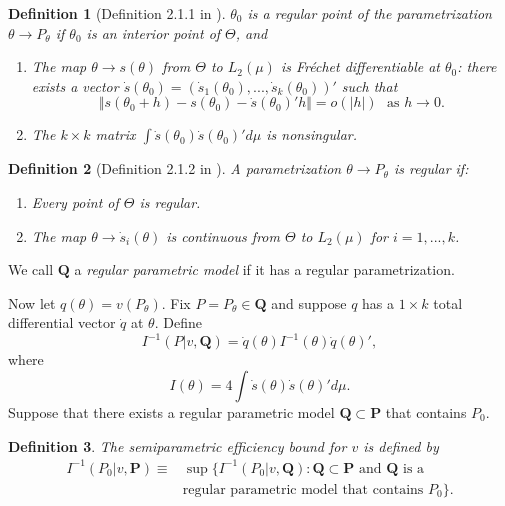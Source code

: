 \documentclass[letterpaper]{article} \usepackage{aaai19}  \usepackage{times}  \usepackage{helvet}  \usepackage{courier}  \usepackage{url}  \usepackage{graphicx}  \frenchspacing  \usepackage{comment}
\newtheorem{definition}{Definition}
\newcommand{\citet}[1]
{\citeauthor{#1} \shortcite{#1}}
\begin{document}
\begin{definition}[Definition 2.1.1 in \citet{Bickel1993}]
	$\theta_0$ is a {\it regular point} of the parametrization $\theta\rightarrow P_\theta$ if $\theta_0$ is an interior point of $\Theta$, and
	\renewcommand\labelenumi{(\roman{enumi})}
	\begin{enumerate}
		\setlength{\itemindent}{10pt}
		\item The map $\theta\rightarrow s(\theta)$ from $\Theta$ to $L_2(\mu)$ is Fr\'echet differentiable at $\theta_0$: there exists a vector $\dot s(\theta_0)=(\dot s_1(\theta_0),...,\dot s_k(\theta_0))'$ such that
		$$
		\Vert s(\theta_0+h)-s(\theta_0)-\dot s(\theta_0)'h\Vert=o(|h|) \ \ \ \text{as $h\rightarrow 0$}.
		$$
		\item The $k\times k$ matrix $\int \dot s(\theta_0)\dot s(\theta_0)' d\mu$ is nonsingular.
	\end{enumerate}
\end{definition}

\begin{definition}[Definition 2.1.2 in \citet{Bickel1993}]
	A parametrization $\theta\rightarrow P_\theta$ is {\it regular} if:
	\renewcommand\labelenumi{(\roman{enumi})}
	\begin{enumerate}
		\setlength{\itemindent}{10pt}
		\item Every point of $\Theta$ is regular.
		\item The map $\theta\rightarrow \dot s_i(\theta)$ is continuous from $\Theta$ to $L_2(\mu)$ for $i=1,...,k$.
	\end{enumerate}
\end{definition}
\noindent
We call $\mathbf{Q}$ a {\it regular parametric model} if it has a regular parametrization.

Now let $q(\theta)=v(P_\theta)$.
Fix $P=P_\theta\in \mathbf{Q}$ and suppose $q$ has a $1\times k$ total differential vector $\dot q$ at $\theta$.
Define
$$
I^{-1}(P|v,\mathbf{Q})=\dot q(\theta)I^{-1}(\theta)\dot q(\theta)',
$$
where
$$
I(\theta) = 4\int \dot s(\theta)\dot s(\theta)'d\mu.
$$
Suppose that there exists a regular parametric model $\mathbf{Q}\subset \mathbf{P}$ that contains $P_0$.

\begin{definition}
	The {\it semiparametric efficiency bound} for $v$ is defined by
	\begin{align*}
		I^{-1}(P_0|v,\mathbf{P}) \equiv&\sup\{I^{-1}(P_0|v,\mathbf{Q}): \mathbf{Q}\subset \mathbf{P} \text{ and $\mathbf{Q}$ is a}\\
		&\text{regular parametric model that contains $P_0$}\}.
	\end{align*}
\end{definition}
\end{document}
